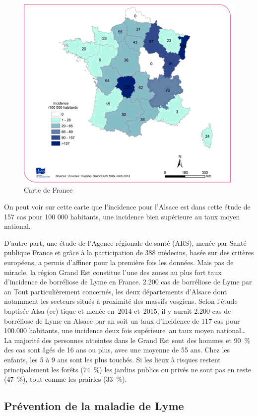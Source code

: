\documentclass[12pt,a4wide]{article}
\begin{document}
\begin{figure}[htb]
\centering
\includegraphics[width=.6\linewidth]{./img/carte_lyme.png}
\caption{Carte de France}
\end{figure}




On peut voir sur cette carte que l'incidence pour l'Alsace est dans cette étude de 157 cas pour 100 000 habitants, une incidence bien supérieure au taux moyen national.



D'autre part,  une étude de l'Agence  régionale de santé (ARS),  menée par Santé
publique  France et  grâce à  la participation  de 388  médecins, basée  sur des
critères européens, a permis d'affiner pour  la première fois les données. Mais
pas de miracle, la région Grand Est  constitue l'une des zones au plus fort taux
d'incidence de  borréliose de Lyme en  France.  2.200 cas de  borréliose de Lyme
par  an Tout  particulièrement concernés,  les deux  départements d'Alsace  dont
notamment les  secteurs situés à  proximité des massifs vosgiens.  Selon l'étude
baptisée Alsa  (ce) tique  et menée en 2014  et 2015, il y  aurait 2.200  cas de
borréliose de  Lyme en Alsace par  an soit un  taux d'incidence de 117  cas pour
100.000 habitants, une incidence deux fois supérieure au taux moyen national… La
majorité des personnes atteintes  dans le Grand Est sont des  hommes et 90 \% des
cas sont âgés de  16 ans ou plus, avec une moyenne de  55 ans. Chez les enfants,
les  5  à  9  ans  sont  les  plus touchés.  Si  les  lieux  à  risques  restent
principalement les  forêts (74 \%) les jardins  publics ou privés ne  sont pas en
reste (47 \%), tout comme les prairies (33 \%).


\subsection{Prévention de la maladie de Lyme}
\label{sec-3-7}
\end{document}
